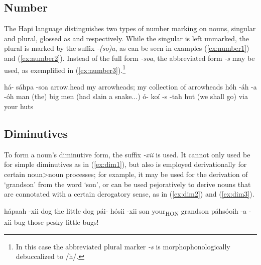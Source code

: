 \documentclass[a4paper, 12pt, oneside]{memoir}
\newcommand{\emh}[1]{\textit{#1}}
\begin{document}
\subsection{Number}\label{snumber}
The Hapi language distinguishes two types of number marking on nouns, singular and plural, glossed as {\Sg} and {\Pl} respectively. While the singular is left unmarked, the plural is marked by the suffix \emh{-(so)a}, as can be seen in examples (\ref{ex:number1}) and (\ref{ex:number2}). Instead of the full form \emh{-soa}, the abbreviated form \emh{-s} may be used, as exemplified in (\ref{ex:number3}).\footnote{In this case the abbreviated plural marker \emh{-s} is morphophonologically debuccalized to /h/.}
\begin{examples}
\ex
\label{ex:number1}
\bits há- sáhpa -soa
\gloss {\Fsposs} arrow.head {\Pl}
\tr my arrowheads; my collection of arrowheads
\ex
\label{ex:number2}
\bits hóh -áh -a -óh
\gloss man {\Aug} {\Pl} {\Erg}
\tr (the) big men (had slain a snake...)
\ex 
\label{ex:number3}
\bits ó- koí -s -tah
\gloss {\Ssposs} hut {\Pl} {\Prl}
\tr (we shall go) via your huts
\end{examples}
\subsection{Diminutives}\label{sdim}
To form a noun's diminutive form, the suffix \emh{-xii} is used. It cannot only used be for simple diminutives as in (\ref{ex:dim1}), but also is employed derivationally for certain noun>noun processes; for example, it may be used for the derivation of `grandson' from the word `son', or can be used pejoratively to derive nouns that are connotated with a certain derogatory sense, as in (\ref{ex:dim2}) and (\ref{ex:dim3}).
\begin{examples}
\ex
\label{ex:dim1}
\bits hápaah -xii 
\gloss dog {\Dim}
\tr the little dog
\ex
\label{ex:dim2}
\bits pái- hósii -xii
\gloss {\Sshposs} son {\Dim}
\tr your\textsubscript{HON} grandson
\ex
\label{ex:dim3}
\bits páhsóoih -a -xii
\gloss bug {\Pl} {\Dim}
\tr those pesky little bugs!
\end{examples}
\end{document}
